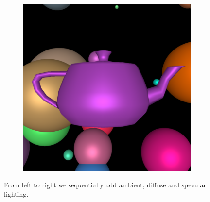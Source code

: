 \documentclass[acmsmall]{acmart}
\begin{document}
\begin{figure}[h]
\begin{subfigure}{.3\textwidth}
\end{subfigure} %
\begin{subfigure}{.3\textwidth}
  \centering
  \includegraphics[width=.9\linewidth]{img/specularteapot.png}
\end{subfigure}    
    
    \caption{From left to right we sequentially add ambient, diffuse and specular lighting.}
    \label{fig:lightteapot}
\end{figure}
\end{document}
